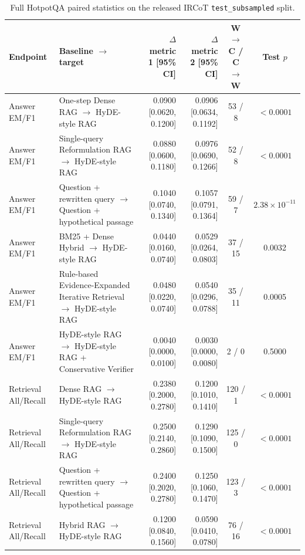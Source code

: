 \begin{table}[t]
\centering
\caption{Full HotpotQA paired statistics on the released IRCoT \texttt{test\_subsampled} split.}
\label{tab:hotpotqa_paired_statistics}
\scriptsize
\begin{threeparttable}
\setlength{\tabcolsep}{3pt}
\begin{tabularx}{\textwidth}{>{\raggedright\arraybackslash}p{}
                            >{\raggedright\arraybackslash}X
                            r r c c}
\toprule
Endpoint & Baseline $\rightarrow$ target & $\Delta$ metric 1 [95\% CI] & $\Delta$ metric 2 [95\% CI] & W$\rightarrow$C / C$\rightarrow$W & Test $p$ \\
\midrule
Answer EM/F1 & One-step Dense RAG $\rightarrow$ HyDE-style RAG & 0.0900 [0.0620, 0.1200] & 0.0906 [0.0634, 0.1192] & 53 / 8 & $<0.0001$ \\
Answer EM/F1 & Single-query Reformulation RAG $\rightarrow$ HyDE-style RAG & 0.0880 [0.0600, 0.1180] & 0.0976 [0.0690, 0.1266] & 52 / 8 & $<0.0001$ \\
Answer EM/F1 & Question + rewritten query $\rightarrow$ Question + hypothetical passage & 0.1040 [0.0740, 0.1340] & 0.1057 [0.0791, 0.1364] & 59 / 7 & $2.38{\times}10^{-11}$ \\
Answer EM/F1 & BM25 + Dense Hybrid $\rightarrow$ HyDE-style RAG & 0.0440 [0.0160, 0.0740] & 0.0529 [0.0264, 0.0803] & 37 / 15 & 0.0032 \\
Answer EM/F1 & Rule-based Evidence-Expanded Iterative Retrieval $\rightarrow$ HyDE-style RAG & 0.0480 [0.0220, 0.0740] & 0.0540 [0.0296, 0.0788] & 35 / 11 & 0.0005 \\
Answer EM/F1 & HyDE-style RAG $\rightarrow$ HyDE-style RAG + Conservative Verifier & 0.0040 [0.0000, 0.0100] & 0.0030 [0.0000, 0.0080] & 2 / 0 & 0.5000 \\
\midrule
Retrieval All/Recall & Dense RAG $\rightarrow$ HyDE-style RAG & 0.2380 [0.2000, 0.2780] & 0.1200 [0.1010, 0.1410] & 120 / 1 & $<0.0001$ \\
Retrieval All/Recall & Single-query Reformulation RAG $\rightarrow$ HyDE-style RAG & 0.2500 [0.2140, 0.2860] & 0.1290 [0.1090, 0.1500] & 125 / 0 & $<0.0001$ \\
Retrieval All/Recall & Question + rewritten query $\rightarrow$ Question + hypothetical passage & 0.2400 [0.2020, 0.2780] & 0.1250 [0.1060, 0.1470] & 123 / 3 & $<0.0001$ \\
Retrieval All/Recall & Hybrid RAG $\rightarrow$ HyDE-style RAG & 0.1200 [0.0840, 0.1560] & 0.0590 [0.0410, 0.0780] & 76 / 16 & $<0.0001$ \\

\end{tabularx}
\end{threeparttable}
\end{table}
